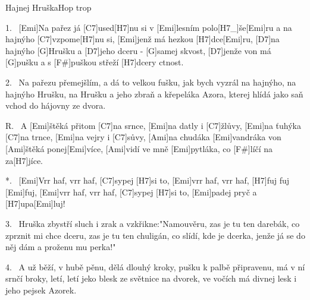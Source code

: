 \begin{song}{Hajnej Hruška}{Hop trop}

\begin{xverse}{1.~}
[\large Emi]Na pařez já [\large C7]used[\large H7]nu si v [\large Emi]lesním polo[\large H7_]{še}[\large Emi]{ru}
a na hajnýho [\large C7]vzpome[\large H7]nu si, [\large Emi]jenž má hezkou [\large H7]dce[\large Emi]ru,
[\large D7]na hajnýho [\large G]Hrušku a [\large D7]jeho dceru - [\large G]samej skvost,
[\large D7]jenže von má [\large G]pušku a s [\large F#]puškou střeží [\large H7]dcery ctnost.
\end{xverse}

\begin{xverse}{2.~}
Na pařezu přemejšlím, a dá to velkou fušku,
jak bych vyzrál na hajnýho, na hajnýho Hrušku,
na Hrušku a jeho zbraň a křepeláka Azora,
kterej hlídá jako saň vchod do hájovny ze dvora.
\end{xverse}

\begin{xverse}{R.~}
A [\large Emi]{ště}ká přitom [\large C7]na srnce, [\large Emi]na datly i [\large C7]{žlů}vy,
[\large Emi]na ťuhýka [\large C7]na trnce, [\large Emi]na vejry i [\large C7]sůvy,
[\large Ami]na chudáka [\large Emi]vandráka von [\large Ami]{ště}ká ponej[\large Emi]více,
[\large Ami]vidí ve mně [\large Emi]pytláka, co [\large F#]líčí na za[\large H7]jíce.
\end{xverse}

\begin{xverse}{*.~}
[\large Emi]Vrr haf, vrr haf, [\large C7]sypej [\large H7]si to, [\large Emi]vrr haf, vrr haf, [\large H7]fuj fuj [\large Emi]fuj,
[\large Emi]vrr haf, vrr haf, [\large C7]sypej [\large H7]si to, [\large Emi]padej pryč a [\large H7]upa[\large Emi]luj!
\end{xverse}

\begin{xverse}{3.~}
Hruška zbystří sluch i zrak a vzkřikne:"Namouvěru,
zas je tu ten darebák, co zprznit mi chce dceru,
zas je tu ten chuligán, co slídí, kde je dcerka,
jenže já se do něj dám a proženu mu perka!"
\end{xverse}

\begin{xverse}{4.~}
A už běží, v hubě pěnu, dělá dlouhý kroky,
pušku k palbě připravenu, má v ní srnčí broky,
letí, letí jeko blesk ze světnice na dvorek,
ve vočích má divnej lesk i jeho pejsek Azorek.
\end{xverse}


\end{song}
